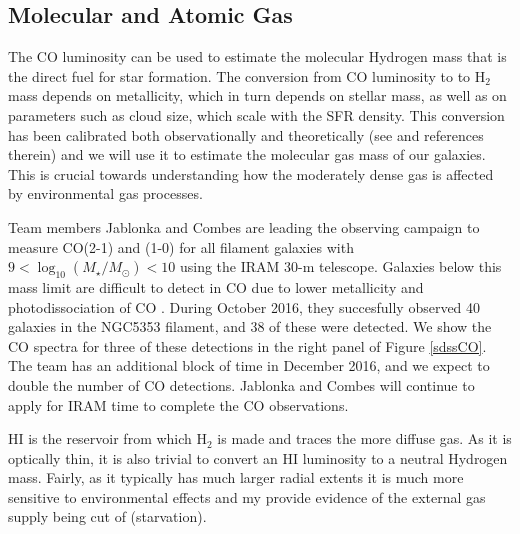\documentclass[11pt, preprint]{aastex}
\begin{document}
{%


\vspace*{-1cm}
\subsection{Molecular and Atomic Gas}
\vspace*{-.3cm}




The CO luminosity can be used to estimate the molecular Hydrogen mass that is the direct fuel for star formation.  The conversion from CO luminosity to to H$_2$ mass depends on metallicity, which in turn depends on stellar mass, as well as on parameters such as cloud size, which scale with the SFR density.  This conversion has been calibrated both observationally and theoretically (see \citet{Bolatto13} and references therein) and we will use it to estimate the molecular gas mass of our galaxies.  This is crucial towards understanding how the moderately dense gas is affected by environmental gas processes.

Team members Jablonka and Combes are leading the observing campaign to
measure CO(2-1) and (1-0)  for all filament galaxies with $9 <
\log_{10}(M_\star/M_\odot) < 10$ using the IRAM 30-m telescope.
Galaxies below this mass limit are difficult to detect in CO due
to lower metallicity and photodissociation of CO
\citep[e.g.][]{cormier14}.   During October 2016, they succesfully observed 40 galaxies in the
NGC5353 filament, and 38 of these were detected.  We show the CO
spectra for three of these detections in the right panel of Figure
\ref{sdssCO}.  The team has an additional block of time in December
2016, and we expect to double the number of CO detections.  Jablonka
and Combes will continue to apply for IRAM time to complete the CO observations.

HI is the reservoir from which H$_2$ is made and traces the more diffuse gas.  As it is optically thin, it is also trivial to convert an HI luminosity to a neutral Hydrogen mass.  Fairly, as it typically has much larger radial extents it is much more sensitive to environmental effects and my provide evidence of the external gas supply being cut of (starvation).  

}
\end{document}
